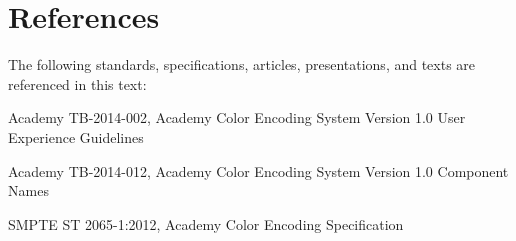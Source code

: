 \numberedformat
\chapter{References}
The following standards, specifications, articles, presentations, and texts are referenced in this text:

Academy TB-2014-002, Academy Color Encoding System Version 1.0 User Experience Guidelines

Academy TB-2014-012, Academy Color Encoding System Version 1.0 Component Names

SMPTE ST 2065-1:2012, Academy Color Encoding Specification